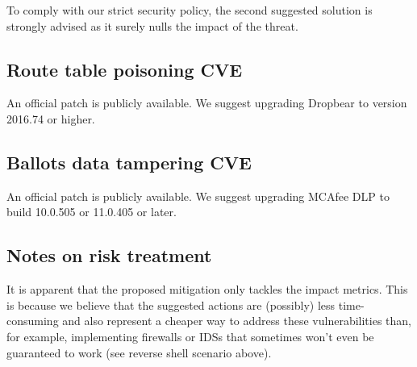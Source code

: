 To comply with our strict security policy, the second suggested solution is strongly advised as it surely nulls the impact of the threat.

\subsection*{Route table poisoning \- CVE}

An official patch is publicly available. We suggest upgrading Dropbear to version 2016.74 or higher.\cite{online:mitigation-cve-2016-7406}

\subsection*{Ballots data tampering \- CVE}

An official patch is publicly available. We suggest upgrading MCAfee DLP to build 10.0.505 or 11.0.405 or later.\cite{online:mitigation-cve-2018-6683}

\subsection*{Notes on risk treatment}

It is apparent that the proposed mitigation only tackles the impact metrics. This is because we believe that the suggested actions are (possibly) less time-consuming and also represent a cheaper way to address these vulnerabilities than, for example, implementing firewalls or IDSs that sometimes won't even be guaranteed to work (see reverse shell scenario above).